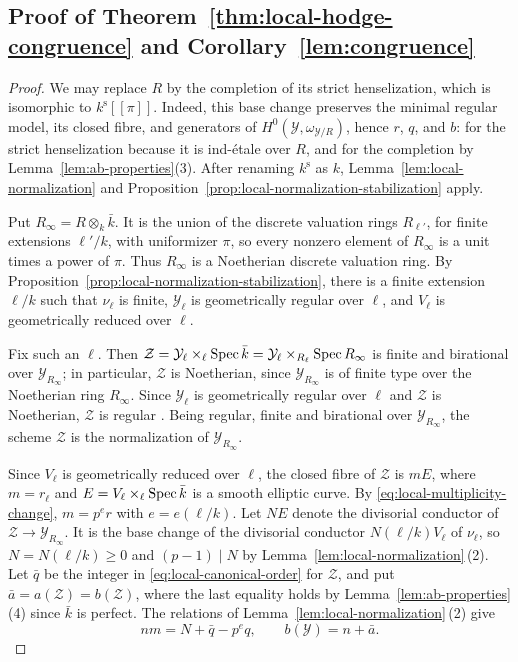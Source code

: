 \subsection{Proof of Theorem~\ref{thm:local-hodge-congruence} and Corollary~\ref{lem:congruence}}\label{subsec:local-conductor-torsion}
\begin{proof}
We may replace $R$ by the completion of its strict henselization, which is isomorphic to $k^{\mathrm s}[[\pi]]$.
Indeed, this base change preserves the minimal regular model, its closed fibre, and generators of $H^0(\mathcal Y,\omega_{\mathcal Y/R})$, hence $r$, $q$, and $b$: for the strict henselization because it is ind-\'etale over $R$, and for the completion by Lemma~\ref{lem:ab-properties}(3).
After renaming $k^{\mathrm s}$ as $k$, Lemma~\ref{lem:local-normalization} and Proposition~\ref{prop:local-normalization-stabilization} apply.

Put $R_\infty=R\otimes_k\bar k$.
It is the union of the discrete valuation rings $R_{\ell'}$, for finite extensions $\ell'/k$, with uniformizer $\pi$, so every nonzero element of $R_\infty$ is a unit times a power of $\pi$.
Thus $R_\infty$ is a Noetherian discrete valuation ring.
By Proposition~\ref{prop:local-normalization-stabilization}, there is a finite extension $\ell/k$ such that $\nu_{\ell}$ is finite, $\mathcal Y_{\ell}$ is geometrically regular over $\ell$, and $V_{\ell}$ is geometrically reduced over $\ell$.

Fix such an $\ell$.
Then $\mathcal Z = \mathcal Y_{\ell}\times_{\ell}\operatorname{Spec}\bar k = \mathcal Y_{\ell}\times_{R_{\ell}}\operatorname{Spec} R_\infty$ is finite and birational over $\mathcal Y_{R_\infty}$; in particular, $\mathcal Z$ is Noetherian, since $\mathcal Y_{R_\infty}$ is of finite type over the Noetherian ring $R_\infty$.
Since $\mathcal Y_{\ell}$ is geometrically regular over $\ell$ and $\mathcal Z$ is Noetherian, $\mathcal Z$ is regular \cite[Proposition~5.13.7]{EGA}.
Being regular, finite and birational over $\mathcal Y_{R_\infty}$, the scheme $\mathcal Z$ is the normalization of $\mathcal Y_{R_\infty}$.

Since $V_{\ell}$ is geometrically reduced over $\ell$, the closed fibre of $\mathcal Z$ is $mE$, where $m = r_{\ell}$ and $E = V_{\ell}\times_{\ell}\operatorname{Spec}\bar k$ is a smooth elliptic curve.
By \eqref{eq:local-multiplicity-change}, $m = p^e r$ with $e = e(\ell/k)$.
Let $NE$ denote the divisorial conductor of $\mathcal Z\to \mathcal Y_{R_\infty}$.
It is the base change of the divisorial conductor $N(\ell/k)V_{\ell}$ of $\nu_{\ell}$, so $N = N(\ell/k)\geq0$ and $(p-1)\mid N$ by Lemma~\ref{lem:local-normalization}\,(2).
Let $\bar q$ be the integer in \eqref{eq:local-canonical-order} for $\mathcal Z$, and put $\bar a=a(\mathcal Z) = b(\mathcal Z)$, where the last equality holds by Lemma~\ref{lem:ab-properties}(4) since $\bar k$ is perfect.
The relations of Lemma~\ref{lem:local-normalization}\,(2) give
\begin{equation}\label{eq:local-conductor-comparison}
  nm=N+\bar q-p^e q,
  \qquad b(\mathcal Y)=n+\bar a.
\end{equation}


\end{proof}
